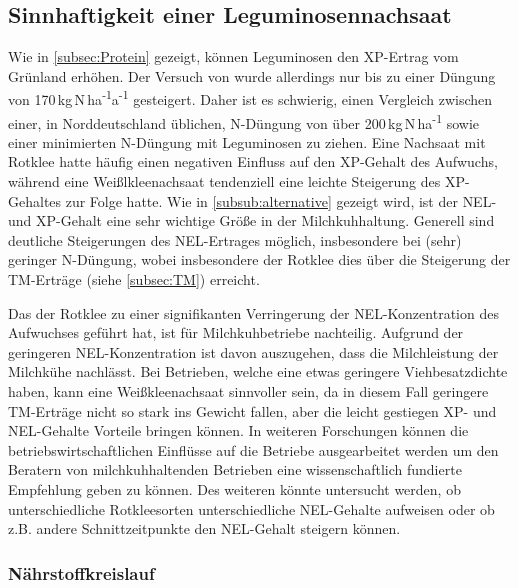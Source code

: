 \subsection{Sinnhaftigkeit einer Leguminosennachsaat}
\label{sub:leguminosen}
Wie in \cref{subsec:Protein} gezeigt, können Leguminosen den \ac{XP}-Ertrag vom Grünland erhöhen.
Der Versuch von \textcite{weggler2050leguminosen} wurde allerdings nur bis zu einer Düngung von 170\,kg\,N\,ha\textsuperscript{-1}a\textsuperscript{-1} gesteigert.
Daher ist es schwierig, einen Vergleich zwischen einer, in Norddeutschland üblichen, N-Düngung von über 200\,kg\,N\,ha\textsuperscript{-1} sowie einer minimierten N-Düngung mit Leguminosen zu ziehen.
Eine Nachsaat mit Rotklee hatte häufig einen negativen Einfluss auf den \ac{XP}-Gehalt des Aufwuchs, während eine Weißlkleenachsaat tendenziell eine leichte Steigerung des \ac{XP}-Gehaltes zur Folge hatte.
Wie in \cref{subsub:alternative} gezeigt wird, ist der \ac{NEL}- und \ac{XP}-Gehalt eine sehr wichtige Größe in der Milchkuhhaltung. 
Generell sind deutliche Steigerungen des \ac{NEL}-Ertrages möglich, insbesondere bei (sehr) geringer N-Düngung, wobei insbesondere der Rotklee dies über die Steigerung der \ac{TM}-Erträge (siehe \cref{subsec:TM}) erreicht.

Das der Rotklee zu einer signifikanten Verringerung der \ac{NEL}-Konzentration des Aufwuchses geführt hat, ist für Milchkuhbetriebe nachteilig.
Aufgrund der geringeren \ac{NEL}-Konzentration ist davon auszugehen, dass die Milchleistung der Milchkühe nachlässt.
Bei Betrieben, welche eine etwas geringere Viehbesatzdichte haben, kann eine Weißkleenachsaat sinnvoller sein, da in diesem Fall geringere \ac{TM}-Erträge nicht so stark ins Gewicht fallen, aber die leicht gestiegen \ac{XP}- und \ac{NEL}-Gehalte Vorteile bringen können.
In weiteren Forschungen können die betriebswirtschaftlichen Einflüsse auf die Betriebe ausgearbeitet werden um den Beratern von milchkuhhaltenden Betrieben eine wissenschaftlich fundierte Empfehlung geben zu können.
Des weiteren könnte untersucht werden, ob unterschiedliche Rotkleesorten unterschiedliche \ac{NEL}-Gehalte aufweisen oder ob z.B. andere Schnittzeitpunkte den \ac{NEL}-Gehalt steigern können.

\subsubsection{Nährstoffkreislauf}
\label{subsub:nährstoffkreislauf}

